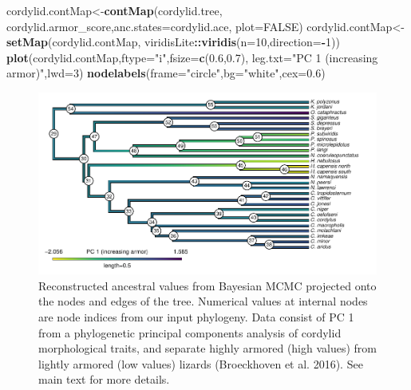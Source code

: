 \documentclass[fleqn,10pt,lineno]{wlpeerj} %
\newenvironment{Shaded}{\begin{snugshade}}{\end{snugshade}}
\newcommand{\AttributeTok}[1]{\textcolor[rgb]{0.13,0.29,0.53}{#1}}
\newcommand{\ConstantTok}[1]{\textcolor[rgb]{0.56,0.35,0.01}{#1}}
\newcommand{\DecValTok}[1]{\textcolor[rgb]{0.00,0.00,0.81}{#1}}
\newcommand{\FloatTok}[1]{\textcolor[rgb]{0.00,0.00,0.81}{#1}}
\newcommand{\FunctionTok}[1]{\textcolor[rgb]{0.13,0.29,0.53}{\textbf{#1}}}
\newcommand{\NormalTok}[1]{#1}
\newcommand{\OtherTok}[1]{\textcolor[rgb]{0.56,0.35,0.01}{#1}}
\newcommand{\SpecialCharTok}[1]{\textcolor[rgb]{0.81,0.36,0.00}{\textbf{#1}}}
\newcommand{\StringTok}[1]{\textcolor[rgb]{0.31,0.60,0.02}{#1}}
\begin{document}
\begin{Shaded}
\begin{Highlighting}[]
\NormalTok{cordylid.contMap}\OtherTok{\textless{}{-}}\FunctionTok{contMap}\NormalTok{(cordylid.tree,}
\NormalTok{  cordylid.armor\_score,}\AttributeTok{anc.states=}\NormalTok{cordylid.ace,}
  \AttributeTok{plot=}\ConstantTok{FALSE}\NormalTok{)}
\NormalTok{cordylid.contMap}\OtherTok{\textless{}{-}}\FunctionTok{setMap}\NormalTok{(cordylid.contMap,}
\NormalTok{  viridisLite}\SpecialCharTok{::}\FunctionTok{viridis}\NormalTok{(}\AttributeTok{n=}\DecValTok{10}\NormalTok{,}\AttributeTok{direction=}\SpecialCharTok{{-}}\DecValTok{1}\NormalTok{))}
\FunctionTok{plot}\NormalTok{(cordylid.contMap,}\AttributeTok{ftype=}\StringTok{"i"}\NormalTok{,}\AttributeTok{fsize=}\FunctionTok{c}\NormalTok{(}\FloatTok{0.6}\NormalTok{,}\FloatTok{0.7}\NormalTok{),}
  \AttributeTok{leg.txt=}\StringTok{"PC 1 (increasing armor)"}\NormalTok{,}\AttributeTok{lwd=}\DecValTok{3}\NormalTok{)}
\FunctionTok{nodelabels}\NormalTok{(}\AttributeTok{frame=}\StringTok{"circle"}\NormalTok{,}\AttributeTok{bg=}\StringTok{"white"}\NormalTok{,}\AttributeTok{cex=}\FloatTok{0.6}\NormalTok{)}
\end{Highlighting}
\end{Shaded}

\begin{figure}
\includegraphics[width=1\linewidth]{Revell.phytools-v2_peerj_files/figure-latex/fig11-cordylid-ace-1} \caption{Reconstructed ancestral values from Bayesian MCMC projected onto the nodes and edges of the tree. Numerical values at internal nodes are node indices from our input phylogeny. Data consist of PC 1 from a phylogenetic principal components analysis of cordylid morphological traits, and separate highly armored (high values) from lightly armored (low values) lizards (Broeckhoven et al. 2016). See main text for more details.}\label{fig:fig11-cordylid-ace}
\end{figure}
\end{document}

